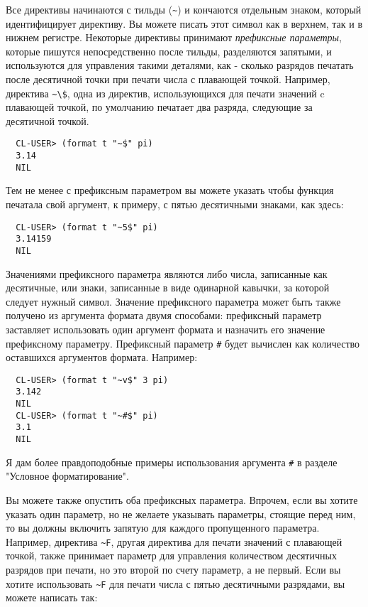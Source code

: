 {Все директивы начинаются с тильды (\lstinline!~!) и кончаются отдельным знаком, который
идентифицирует директиву. Вы можете писать этот символ как в верхнем, так и в нижнем
регистре. Некоторые директивы принимают \textit{префиксные параметры}, которые пишутся
непосредственно после тильды, разделяются запятыми, и используются для управления такими
деталями, как - сколько разрядов печатать после десятичной точки при печати числа с
плавающей точкой. Например, директива \lstinline!~\$!, одна из директив, использующихся
для печати значений c плавающей точкой, по умолчанию печатает два разряда, следующие за
десятичной точкой.

\begin{verbatim}
  CL-USER> (format t "~$" pi)
  3.14
  NIL
\end{verbatim}

Тем не менее с префиксным параметром вы можете указать чтобы функция печатала свой
аргумент, к примеру, с пятью десятичными знаками, как здесь:

\begin{verbatim}
  CL-USER> (format t "~5$" pi)
  3.14159
  NIL
\end{verbatim}

Значениями префиксного параметра являются либо числа, записанные как десятичные, или
знаки, записанные в виде одинарной кавычки, за которой следует нужный символ. Значение
префиксного параметра может быть также получено из аргумента формата двумя способами:
префиксный параметр  заставляет  использовать один аргумент формата и
назначить его значение префиксному параметру. Префиксный параметр \lstinline!#! будет вычислен
как количество оставшихся аргументов формата. Например:

\begin{verbatim}
  CL-USER> (format t "~v$" 3 pi)
  3.142
  NIL
  CL-USER> (format t "~#$" pi)
  3.1
  NIL
\end{verbatim}

Я дам более правдоподобные примеры использования аргумента \lstinline!#! в разделе "Условное форматирование".

Вы можете также опустить оба префиксных параметра. Впрочем, если вы хотите указать один
параметр, но не желаете указывать параметры, стоящие перед ним, то вы должны включить
запятую для каждого пропущенного параметра. Например, директива \lstinline!~F!, другая
директива для печати значений с плавающей точкой, также принимает параметр для управления
количеством десятичных разрядов при печати, но это второй по счету параметр, а не
первый. Если вы хотите использовать \lstinline!~F! для печати числа с пятью десятичными
разрядами, вы можете написать так:

}
